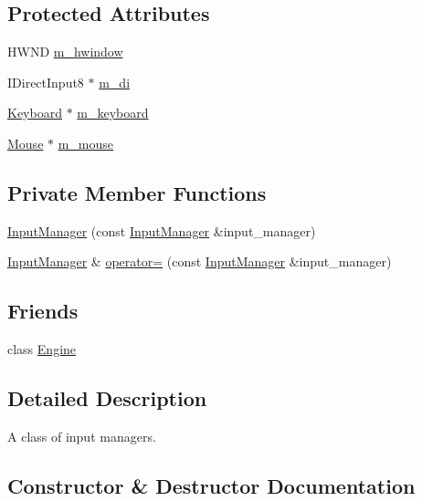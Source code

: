 \subsection*{Protected Attributes}
\begin{DoxyCompactItemize}
\item 
H\+W\+ND \hyperlink{classmage_1_1_input_manager_a07a1d3a593bc497c747c6d2e4605a229}{m\+\_\+hwindow}
\item 
I\+Direct\+Input8 $\ast$ \hyperlink{classmage_1_1_input_manager_a7341c72992efb7bee780111118f9589b}{m\+\_\+di}
\item 
\hyperlink{classmage_1_1_keyboard}{Keyboard} $\ast$ \hyperlink{classmage_1_1_input_manager_a04251723b39860d1436295ca74d5e997}{m\+\_\+keyboard}
\item 
\hyperlink{classmage_1_1_mouse}{Mouse} $\ast$ \hyperlink{classmage_1_1_input_manager_a41f41c1c021cc6dae422cb9abe7b8f87}{m\+\_\+mouse}
\end{DoxyCompactItemize}
\subsection*{Private Member Functions}
\begin{DoxyCompactItemize}
\item 
\hyperlink{classmage_1_1_input_manager_ae97d703ccdec640027b1fa584073c650}{Input\+Manager} (const \hyperlink{classmage_1_1_input_manager}{Input\+Manager} \&input\+\_\+manager)
\item 
\hyperlink{classmage_1_1_input_manager}{Input\+Manager} \& \hyperlink{classmage_1_1_input_manager_a4d2af7a8760b1bc19ef0b642ba7a351c}{operator=} (const \hyperlink{classmage_1_1_input_manager}{Input\+Manager} \&input\+\_\+manager)
\end{DoxyCompactItemize}
\subsection*{Friends}
\begin{DoxyCompactItemize}
\item 
class \hyperlink{classmage_1_1_input_manager_a3e1914489e4bed4f9f23cdeab34a43dc}{Engine}
\end{DoxyCompactItemize}


\subsection{Detailed Description}
A class of input managers. 

\subsection{Constructor \& Destructor Documentation}
\hypertarget{classmage_1_1_input_manager_afc28df27a0251c242113a9761c007534}{}\label{classmage_1_1_input_manager_afc28df27a0251c242113a9761c007534} 
